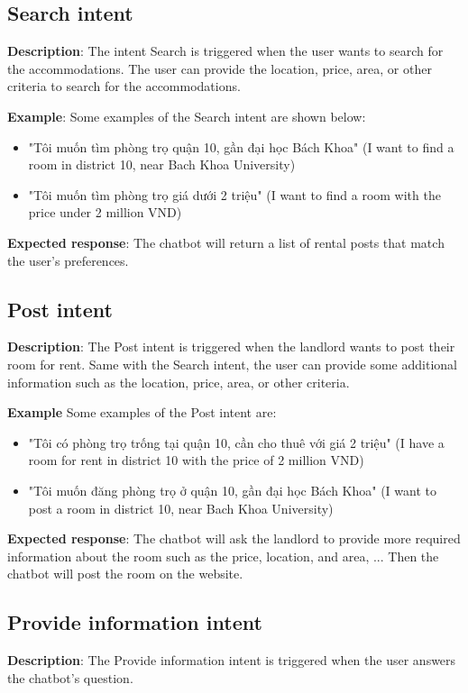 \subsection{Search intent}
\textbf{Description}: The intent Search is triggered when the user wants to search for the accommodations. The user can provide the location, price, area, or other criteria to search for the accommodations. 

\noindent \textbf{Example}: Some examples of the Search intent are shown below:
\begin{itemize}
    \item "Tôi muốn tìm phòng trọ quận 10, gần đại học Bách Khoa" (I want to find a room in district 10, near Bach Khoa University)
    \item "Tôi muốn tìm phòng trọ giá dưới 2 triệu" (I want to find a room with the price under 2 million VND)
\end{itemize} 

\noindent \textbf{Expected response}: The chatbot will return a list of rental posts that match the user's preferences.

\subsection{Post intent}
\textbf{Description}: The Post intent is triggered when the landlord wants to post their room for rent. Same with the Search intent, the user can provide some additional information such as the location, price, area, or other criteria. 

\noindent \textbf{Example} Some examples of the Post intent are:
\begin{itemize}
    \item "Tôi có phòng trọ trống tại quận 10, cần cho thuê với giá 2 triệu" (I have a room for rent in district 10 with the price of 2 million VND)
    \item "Tôi muốn đăng phòng trọ ở quận 10, gần đại học Bách Khoa" (I want to post a room in district 10, near Bach Khoa University)
\end{itemize}

\noindent \textbf{Expected response}: The chatbot will ask the landlord to provide more required information about the room such as the price, location, and area, ... Then the chatbot will post the room on the website.

\subsection{Provide information intent}
\textbf{Description}: The Provide information intent is triggered when the user answers the chatbot's question. 

